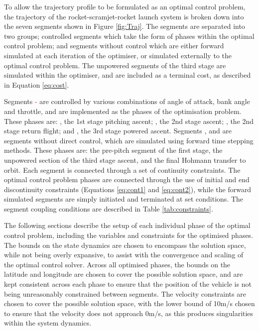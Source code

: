  
 To allow the trajectory profile to be formulated as an optimal control problem, the trajectory of the rocket-scramjet-rocket launch system is broken down into the seven segments shown in Figure \ref{fig:Traj}. 
  The segments are separated into two groups; controlled segments which take the form of phases within the optimal control problem; and segments without control which are either forward simulated at each iteration of the optimiser, or simulated externally to the optimal control problem. The unpowered segments of the third stage are simulated within the optimiser, and are included as a terminal cost, as described in Equation \ref{eq:cost}. 
  
 Segments \textcolor{red}{-} are controlled by various combinations of angle of attack, bank angle and throttle, and are implemented as the phases of the optimisation problem. These phases are: \textcolor{red}{}, the 1st stage pitching ascent; \textcolor{red}{}, the 2nd stage ascent; \textcolor{red}{}, the 2nd stage return flight; and \textcolor{red}{}, the 3rd stage powered ascent.
 Segments \textcolor{red}{},\textcolor{red}{} and \textcolor{red}{} are segments without direct control, which are simulated using forward time stepping methods. 
 These phases are: the pre-pitch segment of the first stage, the unpowered section of the third stage ascent, and the final Hohmann transfer to orbit. 
 Each segment is connected through a set of continuity constraints. 
  The optimal control problem phases are connected through the use of initial and end discontinuity constraints (Equations \ref{eq:cont1} and \ref{eq:cont2}), while the forward simulated segments are simply initiated and terminated at set conditions. 
 The segment coupling conditions are described in Table \ref{tab:constraints}.


The following sections describe the setup of each individual phase of the optimal control problem, including the variables and constraints for the optimised phases. 
The bounds on the state dynamics are chosen to encompass the solution space, while not being overly expansive, to assist with the convergence and scaling of the optimal control solver. 
Across all optimised phases, the bounds on the latitude and longitude are chosen to cover the possible solution space, and are kept consistent across each phase to ensure that the position of the vehicle is not being unreasonably constrained between segments. The velocity constraints are chosen to cover the possible solution space, with the lower bound of 10m/s chosen to ensure that the velocity does not approach 0m/s, as this produces singularities within the system dynamics.




